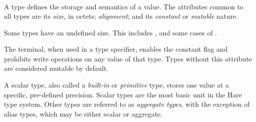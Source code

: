 
\begin{grammar}
 \\
	 \\
	 \\
	 \\
	 \\
	 \\
	 \\
	  \\

 \\
	 \\
	 \\
	 \\
	 \\
	 \\
	 \\
	 \\
\end{grammar}

\specsubitem
A type defines the storage and semantics of a value. The attributes common to
all types are its \textit{size}, in octets; \textit{alignment}; and its
\textit{constant} or \textit{mutable} nature.

\specsubitem
Some types have an undefined size. This includes ,
and some cases of .

\specsubitem
The  terminal, when used in a type specifier, enables the
constant flag and prohibits write operations on any value of that type. Types
without this attribute are considered mutable by default.

\specsubitem
A scalar type, also called a \textit{built-in} or \textit{primitive} type,
stores one value at a specific, pre-defined precision. Scalar types are the
most basic unit in the Hare type system. Other types are referred to as
\textit{aggregate types}, with the exception of alias types, which may be
either scalar or aggregate.


\begin{grammar}
\oneof \\
\end{grammar}

